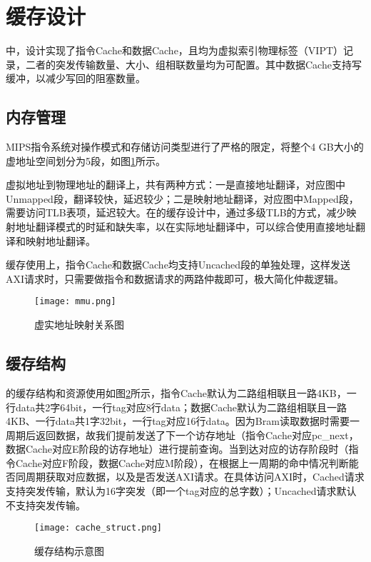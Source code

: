 \section{缓存设计}

\cpuname 中，设计实现了指令Cache和数据Cache，且均为虚拟索引物理标签（VIPT）记录，二者的突发传输数量、大小、组相联数量均为可配置。其中数据Cache支持写缓冲，以减少写回的阻塞数量。

\subsection{内存管理}
MIPS指令系统对操作模式和存储访问类型进行了严格的限定，将整个4 GB大小的虚地址空间划分为5段，如图\ref{img:mmu}所示。

虚拟地址到物理地址的翻译上，共有两种方式：一是直接地址翻译，对应图中Unmapped段，翻译较快，延迟较少；二是映射地址翻译，对应图中Mapped段，需要访问TLB表项，延迟较大。在\cpuname 的缓存设计中，通过多级TLB的方式，减少映射地址翻译模式的时延和缺失率，以在实际地址翻译中，可以综合使用直接地址翻译和映射地址翻译。

缓存使用上，指令Cache和数据Cache均支持Uncached段的单独处理，这样发送AXI请求时，只需要做指令和数据请求的两路仲裁即可，极大简化仲裁逻辑。

\begin{figure}[htpb]
    \centering
    \texttt{[image: mmu.png]}
    \caption{虚实地址映射关系图}
    \label{img:mmu}
\end{figure}

\subsection{缓存结构}
\cpuname 的缓存结构和资源使用如图\ref{img:struct}所示，指令Cache默认为二路组相联且一路4KB，一行data共2字64bit，一行tag对应8行data；数据Cache默认为二路组相联且一路4KB、一行data共1字32bit，一行tag对应16行data。因为Bram读取数据时需要一周期后返回数据，故我们提前发送了下一个访存地址（指令Cache对应pc\_next，数据Cache对应E阶段的访存地址）进行提前查询。当到达对应的访存阶段时（指令Cache对应F阶段，数据Cache对应M阶段），在根据上一周期的命中情况判断能否同周期获取对应数据，以及是否发送AXI请求。在具体访问AXI时，Cached请求支持突发传输，默认为16字突发（即一个tag对应的总字数）；Uncached请求默认不支持突发传输。

\begin{figure}[htpb]
    \centering
    \texttt{[image: cache\_struct.png]}
    \caption{\cpuname 缓存结构示意图}
    \label{img:struct}
\end{figure}

